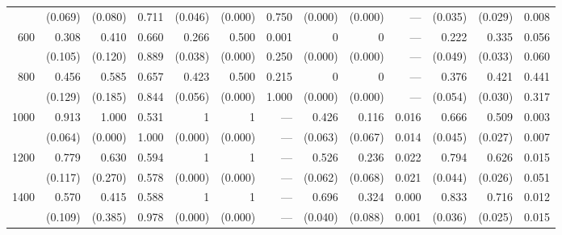 \documentclass[12pt]{scrartcl}
\begin{document}
\begin{landscape}
\begin{table}[h!t!]
{\begin{tabular}{rrrrrrrrrrrrr}
                          & (0.069)         & (0.080)   & 0.711    & (0.046)         & (0.000)   & 0.750    & (0.000)         & (0.000)          & ---     & (0.035)         & (0.029)         & 0.008   \\
             600          &  0.308          &  0.410    & 0.660    &  0.266          &  0.500    & 0.001    &  0              &  0               & ---     &  0.222          &  0.335          & 0.056   \\
                          & (0.105)         & (0.120)   & 0.889    & (0.038)         & (0.000)   & 0.250    & (0.000)         & (0.000)          & ---     & (0.049)         & (0.033)         & 0.060   \\
             800          &  0.456          &  0.585    & 0.657    &  0.423          &  0.500    & 0.215    &  0              &  0               & ---     &  0.376          &  0.421          & 0.441   \\
                          & (0.129)         & (0.185)   & 0.844    & (0.056)         & (0.000)   & 1.000    & (0.000)         & (0.000)          & ---     & (0.054)         & (0.030)         & 0.317   \\
            1000          &  0.913          &  1.000    & 0.531    &  1              &  1        & ---      &  0.426          &  0.116           & 0.016   &  0.666          &  0.509          & 0.003   \\
                          & (0.064)         & (0.000)   & 1.000    & (0.000)         & (0.000)   & ---      & (0.063)         & (0.067)          & 0.014   & (0.045)         & (0.027)         & 0.007   \\
            1200          &  0.779          &  0.630    & 0.594    &  1              &  1        & ---      &  0.526          &  0.236           & 0.022   &  0.794          &  0.626          & 0.015   \\
                          & (0.117)         & (0.270)   & 0.578    & (0.000)         & (0.000)   & ---      & (0.062)         & (0.068)          & 0.021   & (0.044)         & (0.026)         & 0.051   \\
            1400          &  0.570          &  0.415    & 0.588    &  1              &  1        & ---      &  0.696          &  0.324           & 0.000   &  0.833          &  0.716          & 0.012   \\
                          & (0.109)         & (0.385)   & 0.978    & (0.000)         & (0.000)   & ---      & (0.040)         & (0.088)          & 0.001   & (0.036)         & (0.025)         & 0.015   \\

\end{tabular}}
\end{table}
\end{landscape}
\end{document}
